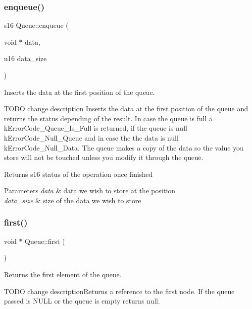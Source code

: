 \subsubsection{\texorpdfstring{enqueue()}{enqueue()}}
{\footnotesize\ttfamily s16 Queue\+::enqueue (\begin{DoxyParamCaption}\item[{void $\ast$}]{data,  }\item[{u16}]{data\+\_\+size }\end{DoxyParamCaption})}



Inserts the data at the first position of the queue. 

T\+O\+DO change description Inserts the data at the first position of the queue and returns the status depending of the result. In case the queue is full a k\+Error\+Code\+\_\+\+Queue\+\_\+\+Is\+\_\+\+Full is returned, if the queue is null k\+Error\+Code\+\_\+\+Null\+\_\+\+Queue and in case the the data is null k\+Error\+Code\+\_\+\+Null\+\_\+\+Data. The queue makes a copy of the data so the value you store will not be touched unless you modify it through the queue.

\begin{DoxyReturn}{Returns}
s16 status of the operation once finished 
\end{DoxyReturn}

\begin{DoxyParams}{Parameters}
{\em data} & data we wish to store at the position \\
\hline
{\em data\+\_\+size} & size of the data we wish to store \\
\hline
\end{DoxyParams}
\mbox{\label{class_queue_ac416befe32e427c4367d3807b283858a}} 
\subsubsection{\texorpdfstring{first()}{first()}}
{\footnotesize\ttfamily void $\ast$ Queue\+::first (\begin{DoxyParamCaption}{ }\end{DoxyParamCaption})}



Returns the first element of the queue. 

T\+O\+DO change description\+Returns a reference to the first node. If the queue passed is N\+U\+LL or the queue is empty returns null.


